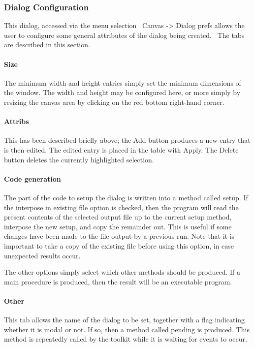 \subsubsection{Dialog Configuration}
This dialog, accessed via the menu selection \ \textsf{Canvas
-{\textgreater} Dialog prefs} allows the user to configure some general
attributes of the dialog being created. \ The tabs are described in
this section.

\paragraph{Size}
The minimum width and height entries simply set the minimum dimensions
of the window. The width and height may be configured here, or more
simply by resizing the canvas area by clicking on the red bottom
right-hand corner.

\paragraph[Attribs]{Attribs}
This has been described briefly above; the Add button produces a new
entry that is then edited. The edited entry is placed in the table with
Apply. The Delete button deletes the currently highlighted selection.

\paragraph{Code generation}
The part of the code to setup the dialog is written into a method called
setup. If the {\textquotedbl}interpose in existing file{\textquotedbl}
option is checked, then the program will read the present contents of
the selected output file up to the current setup method, interpose the
new setup, and copy the remainder out. This is useful if some changes
have been made to the file output by a previous run. Note that it is
important to take a copy of the existing file before using this option,
in case unexpected results occur.

The other options simply select which other methods should be produced.
If a main procedure is produced, then the result will be an executable
program.

\paragraph{Other}
This tab allows the name of the dialog to be set, together with a flag
indicating whether it is {\textquotedbl}modal{\textquotedbl} or not. If
so, then a method called pending is produced. This method is repeatedly
called by the toolkit while it is waiting for events to occur.

